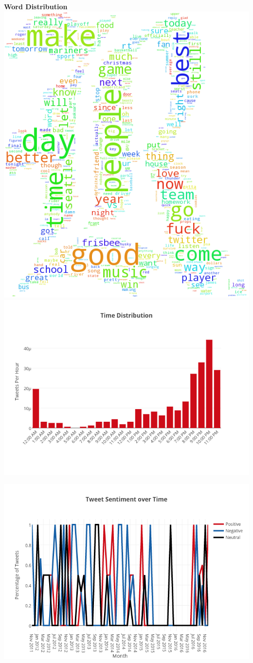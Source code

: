 \documentclass[12pt]{article}
\begin{document}
\begin{center}
\textbf{Word Distribution}\\
\bigbreak
\smallbreak
\includegraphics[width=0.6 \textwidth]{word_cloud.png}\\
\bigbreak
\includegraphics[width=0.8 \textwidth]{tweets_by_time.png}
\newpage
\begin{center}
\includegraphics[width=1.0\textwidth]{sentiment_over_time.png}

\end{center}
\end{center}
\end{document}

